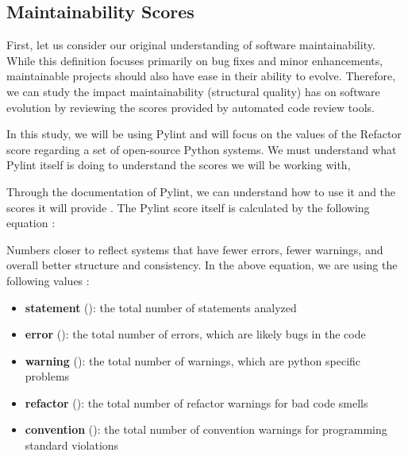 \subsection{Maintainability Scores} \label{subMaintainabilityScores}


First, let us consider our original understanding of software maintainability. While this definition focuses primarily on bug fixes and minor enhancements, maintainable projects should also have ease in their ability to evolve. Therefore, we can study the impact maintainability (structural quality) has on software evolution by reviewing the scores provided by automated code review tools.

In this study, we will be using Pylint and will focus on the values of the Refactor score regarding a set of open-source Python systems. We must understand what Pylint itself is doing to understand the scores we will be working with, 

Through the documentation of Pylint, we can understand how to use it and the scores it will provide \cite{pylint:main}. The Pylint score itself is calculated by the following equation \cite{pylint:score}:

\vspace{0.25cm}
\begin{center}
\end{center}
\vspace{0.25cm}

Numbers closer to  reflect systems that have fewer errors, fewer warnings, and overall better structure and consistency. In the above equation, we are using the following values \cite{pylint:docs}:
\begin{singlespace}
  \begin{itemize}
    \item \textbf{statement} (): the total number of statements analyzed
    \item \textbf{error} (): the total number of errors, which are likely bugs in the code
    \item \textbf{warning} (): the total number of warnings, which are python specific problems
    \item \textbf{refactor} (): the total number of refactor warnings for bad code smells
    \item \textbf{convention} (): the total number of convention warnings for programming standard violations
  \end{itemize}
\end{singlespace}


